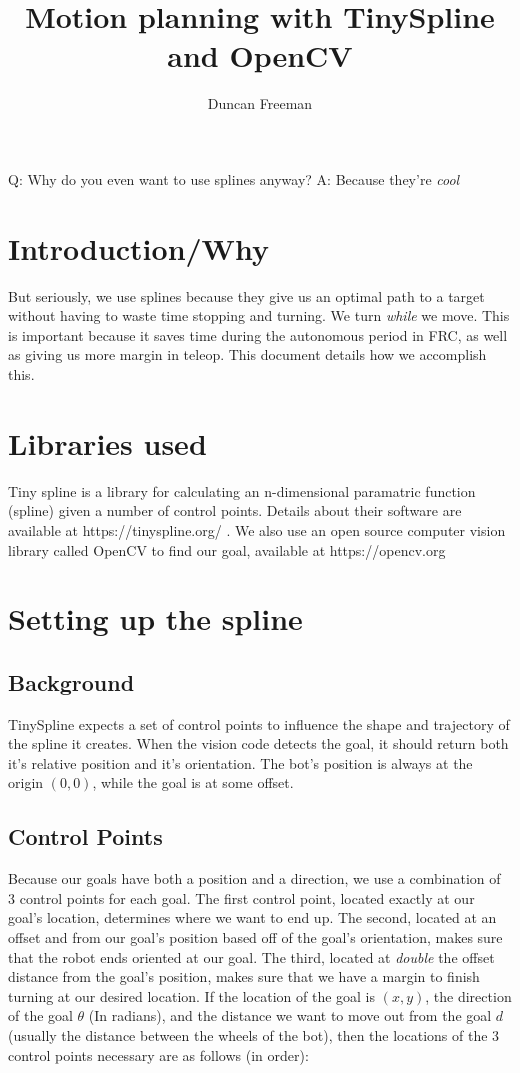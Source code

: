 \documentclass[12pt, english]{article}
\date{}
\title{ Motion planning with TinySpline and OpenCV }
\begin{document}
\author{
	Duncan Freeman
}

\maketitle
\noindent
	\bgroup\obeylines
	Q: Why do you even want to use splines anyway?
	A: Because they're \textit{cool}
	\egroup

\tableofcontents
\newpage

\section{Introduction/Why}
But seriously, we use splines because they give us an optimal path to a target without having to waste time stopping and turning. We turn \textit{while} we move. This is important because it saves time during the autonomous period in FRC, as well as giving us more margin in teleop. This document details how we accomplish this.

\section{Libraries used}
Tiny spline is a library for calculating an n-dimensional paramatric function (spline) given a number of control points. Details about their software are available at https://tinyspline.org/ . We also use an open source computer vision library called OpenCV to find our goal, available at https://opencv.org

\section{Setting up the spline}
\subsection{Background}
TinySpline expects a set of control points to influence the shape and trajectory of the spline it creates. When the vision code detects the goal, it should return both it's relative position and it's orientation. The bot's position is always at the origin $(0,0)$, while the goal is at some offset.

\subsection{Control Points}
Because our goals have both a position and a direction, we use a combination of 3 control points for each goal. The first control point, located exactly at our goal's location, determines where we want to end up. The second, located at an offset and from our goal's position based off of the goal's orientation, makes sure that the robot ends oriented at our goal. The third, located at \textit{double} the offset distance from the goal's position, makes sure that we have a margin to finish turning at our desired location. If the location of the goal is $(x, y)$, the direction of the goal $\theta$ (In radians), and the distance we want to move out from the goal $d$ (usually the distance between the wheels of the bot), then the locations of the 3 control points necessary are as follows (in order): \\
\end{document}
